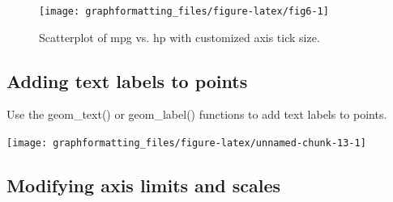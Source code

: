 \documentclass[
]{book}
\newenvironment{Shaded}{\begin{snugshade}}{\end{snugshade}}
\newcommand{\AttributeTok}[1]{\textcolor[rgb]{0.77,0.63,0.00}{#1}}
\newcommand{\ConstantTok}[1]{\textcolor[rgb]{0.00,0.00,0.00}{#1}}
\newcommand{\FloatTok}[1]{\textcolor[rgb]{0.00,0.00,0.81}{#1}}
\newcommand{\FunctionTok}[1]{\textcolor[rgb]{0.00,0.00,0.00}{#1}}
\newcommand{\NormalTok}[1]{#1}
\newcommand{\OtherTok}[1]{\textcolor[rgb]{0.56,0.35,0.01}{#1}}
\newcommand{\SpecialCharTok}[1]{\textcolor[rgb]{0.00,0.00,0.00}{#1}}
\newcommand{\StringTok}[1]{\textcolor[rgb]{0.31,0.60,0.02}{#1}}
\begin{document}
\begin{figure}
\texttt{[image: graphformatting\_files/figure-latex/fig6-1]} \caption{Scatterplot of mpg vs. hp with customized axis tick size.}\label{fig:fig6}
\end{figure}

\hypertarget{adding-text-labels-to-points}{%
\subsection{Adding text labels to points}\label{adding-text-labels-to-points}}

Use the geom\_text() or geom\_label() functions to add text labels to points.

\begin{Shaded}
\end{Shaded}

\texttt{[image: graphformatting\_files/figure-latex/unnamed-chunk-13-1]}

\hypertarget{modifying-axis-limits-and-scales}{%
\subsection{Modifying axis limits and scales}\label{modifying-axis-limits-and-scales}}
\end{document}
